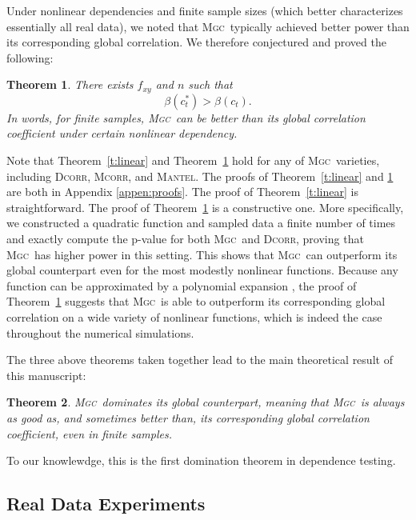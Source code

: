 \documentclass[11pt]{article}
\providecommand{\sct}[1]{{\normalfont\textsc{#1}}}
\newcommand{\G}{c}
\newcommand{\Mgc}{\sct{Mgc}}
\newcommand{\Dcorr}{\sct{Dcorr}}
\newcommand{\Mcorr}{\sct{Mcorr}}
\newcommand{\Mantel}{\sct{Mantel}}
\newtheorem{thm}{Theorem}
\begin{document}
Under nonlinear dependencies and finite sample sizes (which better characterizes essentially all real data), we noted that \Mgc~typically achieved better power than its corresponding global correlation. 
We therefore conjectured and proved the following:
\begin{thm}
\label{t:non}
There exists $f_{xy}$ and $n$ such that
\begin{equation}
\beta(\G^{*}_{t}) > \beta(\G_{t}).
\end{equation}
In words, for finite samples, \Mgc~can be better than its global correlation coefficient under certain nonlinear dependency.
\end{thm}
Note that Theorem~\ref{t:linear} and Theorem~\ref{t:non} hold for any of \Mgc~varieties, including  \Dcorr, \Mcorr, and \Mantel.
%
The proofs of Theorem~\ref{t:linear} and \ref{t:non} are both in Appendix \ref{appen:proofs}.  The proof of Theorem~\ref{t:linear} is straightforward.  The proof of Theorem~\ref{t:non} is a constructive one. More specifically, we constructed a quadratic function and sampled data a finite number of times and exactly compute the p-value for both \Mgc~and \Dcorr, proving that \Mgc~has higher power in this setting. This shows that \Mgc~can outperform its global counterpart even for the most modestly nonlinear functions.  Because any function can be approximated by a polynomial expansion \cite{RudinBook}, the proof of Theorem~\ref{t:non} suggests that \Mgc~is able to outperform its corresponding global correlation on a wide variety of nonlinear functions, which is indeed the case throughout the numerical simulations. %

The three above theorems taken together lead to the main theoretical result of this manuscript:
\begin{thm}
\Mgc~dominates its global counterpart, meaning that \Mgc~is always as good as, and sometimes better than, its corresponding global correlation coefficient, even in finite samples. 
\end{thm}

To our knowlewdge, this is the first domination theorem in dependence testing.


\subsection*{Real Data Experiments}
\label{numer3}
\end{document}

